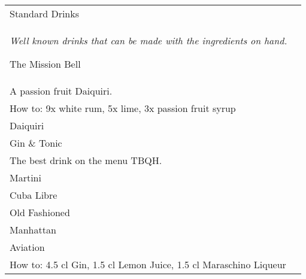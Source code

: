 \documentclass[12pt]{article}
\makeatletter
\newcommand*\ColText[1]{\textcolor{DarkColor}{#1}}
\newenvironment{Group}[1]
  {\noindent\begin{tabular*}{\textwidth}{@{}p{.8\linewidth}@{\extracolsep{\fill}}r@{}}
    {\fontsize{24}{29}\selectfont\ColText{#1}}\\[0.8em]}
  {\end{tabular*}}
\newcommand*\Entry[1]{%
  \sffamily#1 \\
}
\newcommand*\Expl[1]{
  \hspace*{1em}\footnotesize #1 \\
}
\newcommand*\HowTo[1]{
  \hspace*{1em}\footnotesize How to: \hspace*{1em}#1 \\
}
\makeatother
\begin{document}
\vfill

\begin{Group}{Standard Drinks}
\emph{Well known drinks that can be made with the ingredients on hand.}

\Entry{The Mission Bell}
\Expl{A passion fruit Daiquiri.}
\HowTo{9x white rum, 5x lime, 3x passion fruit syrup}

\Entry{Daiquiri}
\Entry{Gin \& Tonic}
\Expl{The best drink on the menu TBQH.}
\Entry{Martini}
\Entry{Cuba Libre}
\Entry{Old Fashioned}
\Entry{Manhattan}

\Entry{Aviation}
\HowTo{4.5 cl Gin, 1.5 cl Lemon Juice, 1.5 cl Maraschino Liqueur}

\end{Group}
\end{document}
